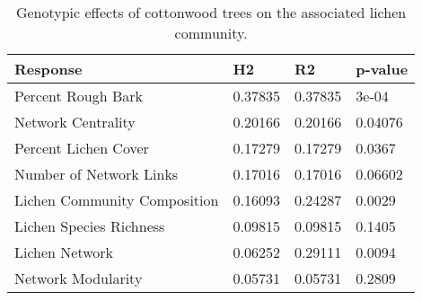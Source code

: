 \begin{table}[ht]
\centering
\begin{tabular}{llll}
  \hline
Response & H2 & R2 & p-value \\ 
  \hline
Percent Rough Bark & 0.37835 & 0.37835 & 3e-04 \\ 
  Network Centrality & 0.20166 & 0.20166 & 0.04076 \\ 
  Percent Lichen Cover & 0.17279 & 0.17279 & 0.0367 \\ 
  Number of Network Links & 0.17016 & 0.17016 & 0.06602 \\ 
  Lichen Community Composition & 0.16093 & 0.24287 & 0.0029 \\ 
  Lichen Species Richness & 0.09815 & 0.09815 & 0.1405 \\ 
  Lichen Network & 0.06252 & 0.29111 & 0.0094 \\ 
  Network Modularity & 0.05731 & 0.05731 & 0.2809 \\ 
   \hline
\end{tabular}
\caption{Genotypic effects of cottonwood trees on the associated lichen community.} 
\label{tab:h2_table}
\end{table}
